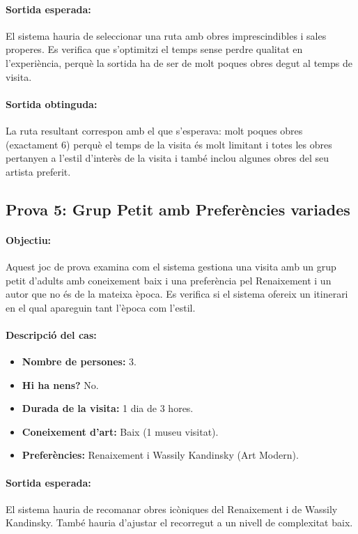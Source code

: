 \documentclass[a4paper]{article}
\begin{document}
	\paragraph{Sortida esperada:}
	El sistema hauria de seleccionar una ruta amb obres imprescindibles i sales properes. Es verifica que s’optimitzi el temps sense perdre qualitat en l’experiència, perquè la sortida ha de ser de molt poques obres degut al temps de visita.
	
	\paragraph{Sortida obtinguda:}
	La ruta resultant correspon amb el que s'esperava: molt poques obres (exactament 6) perquè el temps de la visita és molt limitant i totes les obres pertanyen a l'estil d'interès de la visita i també inclou algunes obres del seu artista preferit.
	
	\subsection{Prova 5: Grup Petit amb Preferències variades}
	
	\paragraph{Objectiu:} 
	Aquest joc de prova examina com el sistema gestiona una visita amb un grup petit d’adults amb coneixement baix i una preferència pel Renaixement i un autor que no és de la mateixa època. Es verifica si el sistema ofereix un itinerari en el qual apareguin tant l'època com l'estil.
	
	\paragraph{Descripció del cas:} 
	
	\begin{itemize}
		\item \textbf{Nombre de persones:} 3.
		\item \textbf{Hi ha nens?} No.
		\item \textbf{Durada de la visita:} 1 dia de 3 hores.
		\item \textbf{Coneixement d’art:} Baix (1 museu visitat).
		\item \textbf{Preferències:} Renaixement i Wassily Kandinsky (Art Modern).
	\end{itemize}
	
	\paragraph{Sortida esperada:}
	El sistema hauria de recomanar obres icòniques del Renaixement i de Wassily Kandinsky. També hauria d’ajustar el recorregut a un nivell de complexitat baix.
	
\end{document}
